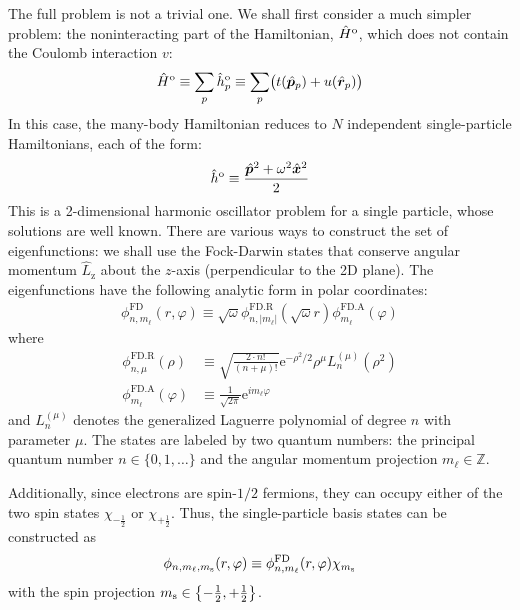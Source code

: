 \documentclass[amsmath, amssymb, aps, floatfix, nofootinbib, preprintnumbers,showpacs, superscriptaddress, twocolumn]{revtex4-1}
\begin{document}
The full problem is not a trivial one.  We shall first consider a much simpler problem: the noninteracting part of the Hamiltonian, $\hat H^{\text o}$, which does not contain the Coulomb interaction $v$:
\begin{align} \label{eq:onebodyhamiltonian}
  \hat H^{\text o} \equiv \sum_p \hat h^{\text o}_p
  \equiv \sum_{p} \bigl(
  t(\hat{\bm p}_p) + u(\hat{\bm r}_p)
  \bigr)
\end{align}
In this case, the many-body Hamiltonian reduces to $N$ independent
single-particle Hamiltonians, each of the form:
\begin{align*}
  \hat h^{\text o} \equiv
  \frac{\hat{\bm p}^2 + \omega^2 \hat{\bm x}^2}{2}
\end{align*}
This is a 2-dimensional harmonic oscillator problem for a single particle,
whose solutions are well known.  There are various ways to construct the set
of eigenfunctions: we shall use the Fock-Darwin states that conserve angular
momentum $\hat{L}_{\text{z}}$ about the $z$-axis (perpendicular to the 2D
plane).  The eigenfunctions have the following analytic form in polar
coordinates:\citep[Appx.\ A]{lohne2010coupled}
\begin{gather*}
  \phi^{\text{FD}}_{n, m_\ell}(r, \varphi)
  \equiv \sqrt\omega
  \phi^{\text{FD.R}}_{n, |m_\ell|}(\sqrt \omega r)
  \phi^{\text{FD.A}}_{m_\ell}(\varphi)
\end{gather*}
where
\begin{align*}
  \phi^{\text{FD.R}}_{n, \mu}(\rho) &\equiv
  \sqrt{\frac{2 \cdot n!}{(n + \mu)!}}
  {\mathrm e}^{- \rho^2 / 2} \rho^\mu L_n^{(\mu)}(\rho^2) \\
  \phi^{\text{FD.A}}_{m_\ell}(\varphi) &\equiv
  \frac{1}{\sqrt{2 \pi}} {\mathrm e}^{i m_\ell \varphi}
\end{align*}
and $L_n^{(\mu)}$ denotes the generalized Laguerre polynomial of degree $n$
with parameter $\mu$.  The states are labeled by two quantum numbers: the
principal quantum number $n \in \{0, 1, \ldots\}$ and the angular momentum
projection $m_\ell \in \mathbb Z$.

Additionally, since electrons are spin-$1/2$ fermions, they can occupy either
of the two spin states $\chi_{-\frac12}$ or $\chi_{+\frac12}$.  Thus, the
single-particle basis states can be constructed as
\begin{align} \label{eq:singleparticlestate}
  \phi_{n, m_\ell, m_{\text s}}(r, \varphi) \equiv
  \phi^{\text{FD}}_{n, m_\ell}(r, \varphi) \chi_{m_{\text s}}
\end{align}
with the spin projection $m_{\text s} \in \bigl\{-\frac12, +\frac12\bigr\}$.
\end{document}

